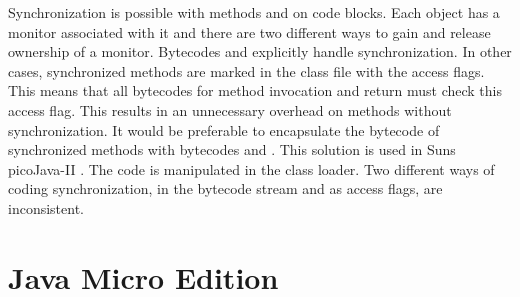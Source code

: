 Synchronization is possible with methods and on code blocks. Each
object has a monitor associated with it and there are two different
ways to gain and release ownership of a monitor. Bytecodes
 and  explicitly handle
synchronization. In other cases, synchronized methods are marked in
the class file with the access flags. This means that all bytecodes
for method invocation and return must check this access flag. This
results in an unnecessary overhead on methods without
synchronization. It would be preferable to encapsulate the bytecode
of synchronized methods with bytecodes  and
. This solution is used in Suns picoJava-II
\cite{pjProgRef}. The code is manipulated in the class loader. Two
different ways of coding synchronization, in the bytecode stream and
as access flags, are inconsistent.

\section{Java Micro Edition}
\label{sec:j2me}

